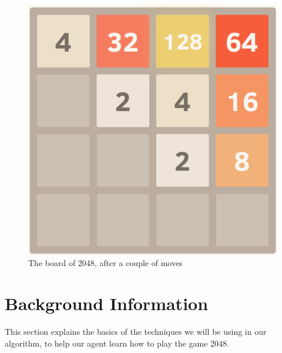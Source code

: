 \documentclass[a4paper,12pt]{article}
\begin{document}
\begin{figure}[H]
\centering
\includegraphics[scale=0.35]{img/2048board}
\caption{The board of 2048, after a couple of moves}
\label{fig:2048}
\end{figure}

\section{Background Information}
This section explains the basics of the techniques we will be using in our algorithm, to help our agent learn how to play the game 2048.
 
\end{document}
